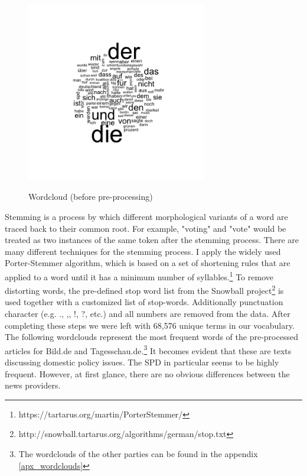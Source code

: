 \documentclass[12pt,a4paper,notitlepage]{article}
\begin{document}
\begin{figure}[H]
	\caption{Wordcloud (before pre-processing)}
	\begin{center}
		\includegraphics[width=0.7\textwidth]{figs/wordcloud.png}
		\label{fig_wordcloud1}
	\end{center}
\end{figure}

Stemming is a process by which different morphological variants of a word are traced back to their common root. For example, "voting" and "vote" would be treated as two instances of the same token after the stemming process. There are many different techniques for the stemming process. I apply the widely used Porter-Stemmer algorithm, which is based on a set of shortening rules that are applied to a word until it has a minimum number of syllables.\footnote{https://tartarus.org/martin/PorterStemmer/} To remove distorting words, the pre-defined stop word list from the Snowball project\footnote{http://snowball.tartarus.org/algorithms/german/stop.txt} is used together with a customized list of stop-words. Additionally punctuation character (e.g. ., ,, !, ?, etc.) and all numbers are removed from the data. After completing these steps we were left with 68,576 unique terms in our vocabulary. The following wordclouds represent the most frequent words of the pre-processed articles for Bild.de and Tagesschau.de.\footnote{The wordclouds of the other parties can be found in the appendix \ref{apx_wordclouds}} It becomes evident that these are texts discussing domestic policy issues. The SPD in particular seems to be highly frequent. However, at first glance, there are no obvious differences between the news providers.  
\end{document}
